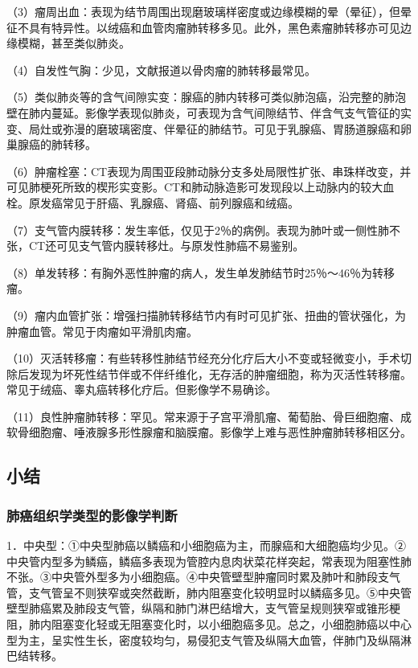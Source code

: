 （3）瘤周出血：表现为结节周围出现磨玻璃样密度或边缘模糊的晕（晕征），但晕征不具有特异性。以绒癌和血管肉瘤肺转移多见。此外，黑色素瘤肺转移亦可见边缘模糊，甚至类似肺炎。

（4）自发性气胸：少见，文献报道以骨肉瘤的肺转移最常见。

（5）类似肺炎等的含气间隙实变：腺癌的肺内转移可类似肺泡癌，沿完整的肺泡壁在肺内蔓延。影像学表现似肺炎，可表现为含气间隙结节、伴含气支气管征的实变、局灶或弥漫的磨玻璃密度、伴晕征的肺结节。可见于乳腺癌、胃肠道腺癌和卵巢腺癌的肺转移。

（6）肿瘤栓塞：CT表现为周围亚段肺动脉分支多处局限性扩张、串珠样改变，并可见肺梗死所致的楔形实变影。CT和肺动脉造影可发现段以上动脉内的较大血栓。原发癌常见于肝癌、乳腺癌、肾癌、前列腺癌和绒癌。

（7）支气管内膜转移：发生率低，仅见于2％的病例。表现为肺叶或一侧性肺不张，CT还可见支气管内膜转移灶。与原发性肺癌不易鉴别。

（8）单发转移：有胸外恶性肿瘤的病人，发生单发肺结节时25％～46％为转移瘤。

（9）瘤内血管扩张：增强扫描肺转移结节内有时可见扩张、扭曲的管状强化，为肿瘤血管。常见于肉瘤如平滑肌肉瘤。

（10）灭活转移瘤：有些转移性肺结节经充分化疗后大小不变或轻微变小，手术切除后发现为坏死性结节伴或不伴纤维化，无存活的肿瘤细胞，称为灭活性转移瘤。常见于绒癌、睾丸癌转移化疗后。但影像学不易确诊。

（11）良性肿瘤肺转移：罕见。常来源于子宫平滑肌瘤、葡萄胎、骨巨细胞瘤、成软骨细胞瘤、唾液腺多形性腺瘤和脑膜瘤。影像学上难与恶性肿瘤肺转移相区分。

\subsection{小结}

\subsubsection{肺癌组织学类型的影像学判断}

1．中央型：①中央型肺癌以鳞癌和小细胞癌为主，而腺癌和大细胞癌均少见。②中央管内型多为鳞癌，鳞癌多表现为管腔内息肉状菜花样突起，常表现为阻塞性肺不张。③中央管外型多为小细胞癌。④中央管壁型肿瘤同时累及肺叶和肺段支气管，支气管呈不则狭窄或突然截断，肺内阻塞变化较明显时以鳞癌多见。⑤中央管壁型肺癌累及肺段支气管，纵隔和肺门淋巴结增大，支气管呈规则狭窄或锥形梗阻，肺内阻塞变化轻或无阻塞变化时，以小细胞癌多见。总之，小细胞肺癌以中心型为主，呈实性生长，密度较均匀，易侵犯支气管及纵隔大血管，伴肺门及纵隔淋巴结转移。

